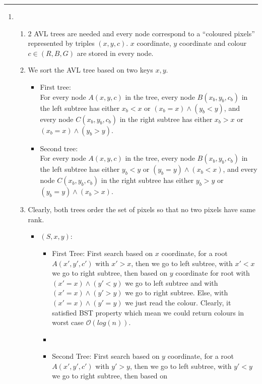 \documentclass[11pt,twoside]{article}
\begin{document}
\rule{\textwidth}{.5pt}


\begin{enumerate}[leftmargin=0pt]
\item 
	\begin{enumerate}
		\item 2 AVL trees are needed and every node correspond to a ``coloured pixels'' represented by triples 
			$(x,y,c)$. $x$ coordinate, $y$ coordinate and colour $c \in (R, B ,G)$ are stored in every node.
		\item We sort the AVL tree based on two keys $x,y$.  
			\begin{itemize} [label={}]
			\item First tree: \\
				 For every node $A(x, y, c)$ in the tree, every node $B(x_b,y_b,c_b)$ in the left subtree has either $x_b < x$ or $(x_b = x) \wedge (y_b < y)$, and every node 
				 $C(x_b, y_b, c_b)$ in the right subtree has either $x_b > x$ or $(x_b = x) \wedge (y_b > y)$. 
			\item Second tree:\\
				For every node $A(x, y, c)$ in the tree, every node $B(x_b,y_b,c_b)$ in the left subtree has either $y_b < y$ or $(y_b = y) \wedge (x_b < x)$, and every node 
				 $C(x_b, y_b, c_b)$ in the right subtree has either $y_b > y$ or $(y_b = y) \wedge (x_b > x)$.				
			\end{itemize}			
		\item 
			Clearly, both trees order the set  of pixels so that no two pixels have same rank. 
			\begin{itemize}
				\item	{}$(S, x, y)$:
						\begin{itemize} [label={}]
						\item First Tree: First search based on $x$ coordinate, for a root $A(x', y', c')$ with $x'>x$, then we go to left subtree, with $x'<x$ we go to right subtree, then based on 
						$y$ coordinate for root with $(x'=x)\wedge (y'< y)$ we go to left subtree and with $(x'= x)\wedge (y'>y)$ we go to right subtree. Else, with $(x' = x) \wedge (y' = y)$ we just read the colour. 
						Clearly, it satisfied BST property which mean we could return colours in worst case $\mathcal{O}(log(n))$.
						\item
						\item Second Tree: First search based on $y$ coordinate, for a root $A(x', y', c')$ with $y'>y$, then we go to left subtree, with $y'<y$ we go to right subtree, then based on 

\end{itemize}
\end{itemize}
\end{enumerate}
\end{enumerate}
\end{document}
